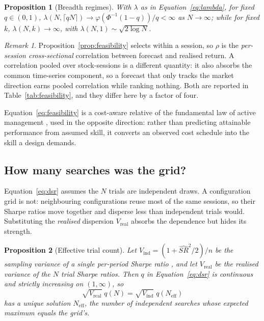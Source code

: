 \documentclass{article}
\theoremstyle{plain}
\newtheorem{proposition}{Proposition}
\theoremstyle{remark}
\newtheorem{remark}{Remark}
\begin{document}
\begin{proposition}[Breadth regimes]
\label{prop:regimes}
With $\lambda$ as in Equation~\ref{eq:lambda}, for fixed $q \in (0,1)$,
$\lambda(N, \lceil qN \rceil) \to \varphi(\Phi^{-1}(1-q))/q < \infty$ as
$N \to \infty$; while for fixed $k$, $\lambda(N,k) \to \infty$, with
$\lambda(N,1) \sim \sqrt{2 \log N}$.
\end{proposition}

\begin{remark}
Proposition~\ref{prop:feasibility} selects within a session, so $\rho$ is the
\emph{per-session cross-sectional} correlation between forecast and realised
return. A correlation pooled over stock-sessions is a different quantity: it also
absorbs the common time-series component, so a forecast that only tracks the
market direction earns pooled correlation while ranking nothing. Both are
reported in Table~\ref{tab:feasibility}, and they differ here by a factor of
four.
\end{remark}

Equation~\ref{eq:feasibility} is a cost-aware relative of the fundamental law of
active management \citep{grinold1989}, used in the opposite direction: rather
than predicting attainable performance from assumed skill, it converts an
observed cost schedule into the skill a design demands.

\subsection{How many searches was the grid?}
\label{sec:trials}

Equation~\ref{eq:dsr} assumes the $N$ trials are independent draws. A
configuration grid is not: neighbouring configurations reuse most of the same
sessions, so their Sharpe ratios move together and disperse less than independent
trials would. Substituting the \emph{realised} dispersion $V_{\mathrm{real}}$
absorbs the dependence but hides its strength.

\begin{proposition}[Effective trial count]
\label{prop:trials}
Let $V_{\mathrm{ind}} = (1 + \hat{SR}^2/2)/n$ be the sampling variance of a
single per-period Sharpe ratio \citep{lo2002}, and let $V_{\mathrm{real}}$ be the
realised variance of the $N$ trial Sharpe ratios. Then $q$ in
Equation~\ref{eq:dsr} is continuous and strictly increasing on $(1,\infty)$, so
\begin{equation}
\label{eq:neff}
\sqrt{V_{\mathrm{real}}}\; q(N) = \sqrt{V_{\mathrm{ind}}}\; q(N_{\mathrm{eff}})
\end{equation}
has a unique solution $N_{\mathrm{eff}}$, the number of independent searches
whose expected maximum equals the grid's.
\end{proposition}
\end{document}

